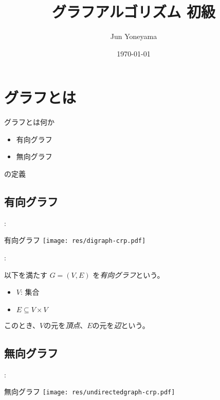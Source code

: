 \documentclass[dvipdfmx]{beamer}
\title{グラフアルゴリズム 初級}
\author{Jun Yoneyama}
\date{\today}
\begin{document}
\frame{\maketitle}

\section{グラフとは}

\begin{frame}{\insertsection}
  \begin{block}{グラフとは何か}
    \begin{itemize}
      \item 有向グラフ
      \item 無向グラフ
    \end{itemize}
    の定義
  \end{block}
\end{frame}

\subsection{有向グラフ}

\begin{frame}{\insertsection: \insertsubsection}
  \begin{block}{有向グラフ}
    \centering
    \texttt{[image: res/digraph-crp.pdf]}
  \end{block}
\end{frame}

\begin{frame}{\insertsection: \insertsubsection}
  \begin{definition}
    以下を満たす $G = (V, E)$ を\emph{有向グラフ}という。
    \begin{itemize}
      \item $V$: 集合
      \item $E \subseteq V \times V$
    \end{itemize}
    このとき、$V$の元を\emph{頂点}、$E$の元を\emph{辺}という。
  \end{definition}
\end{frame}

\subsection{無向グラフ}

\begin{frame}{\insertsection: \insertsubsection}
  \begin{block}{無向グラフ}
    \centering
    \texttt{[image: res/undirectedgraph-crp.pdf]}
  \end{block}
\end{frame}
\end{document}
